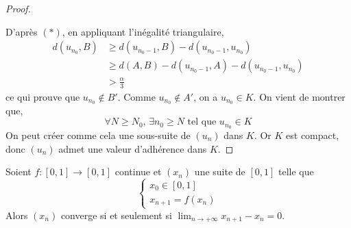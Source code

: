 \begin{proof}
\begin{center}
    \end{center}
    D'après $(*)$, en appliquant l'inégalité triangulaire,
    \begin{align*}
      d(u_{n_0}, B) & \geq d(u_{n_0 - 1}, B) - d(u_{n_0 - 1}, u_{n_0})           \\
      & \geq d(A, B) - d(u_{n_0 - 1}, A) - d(u_{n_0 - 1}, u_{n_0}) \\
      & > \frac{\alpha}{3}
    \end{align*}
    ce qui prouve que $u_{n_0} \notin B'$. Comme $u_{n_0} \notin A'$, on a $u_{n_0} \in K$. On vient de montrer que,
    \[ \forall N \geq N_0, \, \exists n_0 \geq N \text{ tel que } u_{n_0} \in K \]
    On peut créer comme cela une sous-suite de $(u_n)$ dans $K$. Or $K$ est compact, donc $(u_n)$ admet une valeur d'adhérence dans $K$.
  \end{proof}

  \begin{application}
    Soient $f : [0, 1] \rightarrow [0, 1]$ continue et $(x_n)$ une suite de $[0, 1]$ telle que
    \[ \begin{cases} x_0 \in [0, 1] \\ x_{n+1} = f(x_n) \end{cases} \]
    Alors $(x_n)$ converge si et seulement si $\lim_{n \rightarrow +\infty } x_{n+1} - x_n = 0$.
  \end{application}

